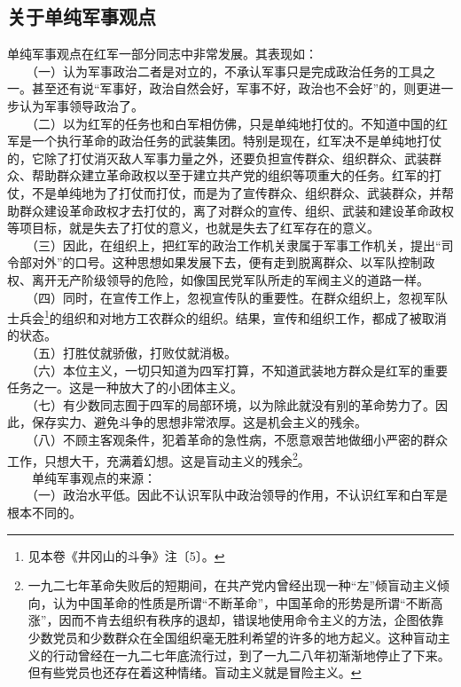 \documentclass[cn,11pt,chinese]{elegantbook}
\def\myformat#1{\hfil\hfil #1}
\begin{document}
\subsection*{\myformat{关于单纯军事观点}}
单纯军事观点在红军一部分同志中非常发展。其表现如：\\
　　（一）认为军事政治二者是对立的，不承认军事只是完成政治任务的工具之一。甚至还有说“军事好，政治自然会好，军事不好，政治也不会好”的，则更进一步认为军事领导政治了。\\
　　（二）以为红军的任务也和白军相仿佛，只是单纯地打仗的。不知道中国的红军是一个执行革命的政治任务的武装集团。特别是现在，红军决不是单纯地打仗的，它除了打仗消灭敌人军事力量之外，还要负担宣传群众、组织群众、武装群众、帮助群众建立革命政权以至于建立共产党的组织等项重大的任务。红军的打仗，不是单纯地为了打仗而打仗，而是为了宣传群众、组织群众、武装群众，并帮助群众建设革命政权才去打仗的，离了对群众的宣传、组织、武装和建设革命政权等项目标，就是失去了打仗的意义，也就是失去了红军存在的意义。\\
　　（三）因此，在组织上，把红军的政治工作机关隶属于军事工作机关，提出“司令部对外”的口号。这种思想如果发展下去，便有走到脱离群众、以军队控制政权、离开无产阶级领导的危险，如像国民党军队所走的军阀主义的道路一样。\\
　　（四）同时，在宣传工作上，忽视宣传队的重要性。在群众组织上，忽视军队士兵会\footnote[1]{ 见本卷《井冈山的斗争》注〔5〕。}的组织和对地方工农群众的组织。结果，宣传和组织工作，都成了被取消的状态。\\
　　（五）打胜仗就骄傲，打败仗就消极。\\
　　（六）本位主义，一切只知道为四军打算，不知道武装地方群众是红军的重要任务之一。这是一种放大了的小团体主义。\\
　　（七）有少数同志囿于四军的局部环境，以为除此就没有别的革命势力了。因此，保存实力、避免斗争的思想非常浓厚。这是机会主义的残余。\\
　　（八）不顾主客观条件，犯着革命的急性病，不愿意艰苦地做细小严密的群众工作，只想大干，充满着幻想。这是盲动主义的残余\footnote[2]{ 一九二七年革命失败后的短期间，在共产党内曾经出现一种“左”倾盲动主义倾向，认为中国革命的性质是所谓“不断革命”，中国革命的形势是所谓“不断高涨”，因而不肯去组织有秩序的退却，错误地使用命令主义的方法，企图依靠少数党员和少数群众在全国组织毫无胜利希望的许多的地方起义。这种盲动主义的行动曾经在一九二七年底流行过，到了一九二八年初渐渐地停止了下来。但有些党员也还存在着这种情绪。盲动主义就是冒险主义。}。\\
　　单纯军事观点的来源：\\
　　（一）政治水平低。因此不认识军队中政治领导的作用，不认识红军和白军是根本不同的。\\
\end{document}
